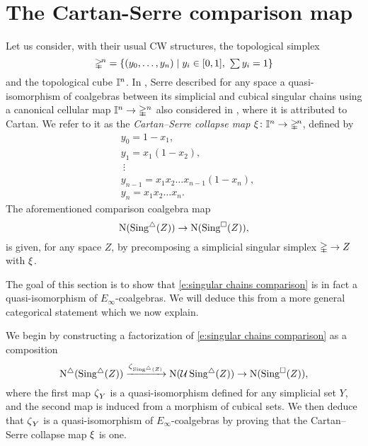 
\section{The Cartan-Serre comparison map} \label{s:the cartan-serre comparison map}

Let us consider, with their usual CW structures, the topological simplex
\[
\mathbb{\Delta}^{\!n} = \{(y_0, \dots, y_n) \mid y_i \in [0,1], \ \textstyle{\sum} \, y_i = 1\}
\]
and the topological cube $\mathbb{I}^n$.
In \cite[p. 442]{serre1951homologie}, Serre described for any space a quasi-isomorphism of coalgebras between its simplicial and cubical singular chains using a canonical cellular map $\mathbb{I}^n \to \mathbb{\Delta}^n$ also considered in \cite[p.199]{eilenberg1953acyclic}, where it is attributed to Cartan.
We refer to it as the \textit{Cartan--Serre collapse map} $\operatorname{\xi} \colon \mathbb{I}^n \to \mathbb{\Delta}^{\!n}$, defined by
\begin{equation} \label{e:cartan-serre collapse map}
\begin{split}
&y_0 = 1 - x_1, \\
&y_1 = x_1(1 - x_2), \\
&\ \vdots \\
&y_{n-1} = x_1 x_2 \dots x_{n-1}(1-x_n), \\
&y_{n} = x_1 x_2 \dots x_n.
\end{split}
\end{equation}
The aforementioned comparison coalgebra map
\begin{equation} \label{e:singular chains comparison}
\operatorname{N}(\operatorname{Sing^{\triangle}}(Z)) \to
\operatorname{N}(\operatorname{Sing^{\square}}(Z)),
\end{equation}
is given, for any space $Z$, by precomposing a simplicial singular simplex $\mathbb{\Delta} \to Z$ with $\operatorname{\xi}$.

The goal of this section is to show that \eqref{e:singular chains comparison} is in fact a quasi-isomorphism of $E_\infty$-coalgebras.
We will deduce this from a more general categorical statement which we now explain.

We begin by constructing a factorization of \eqref{e:singular chains comparison} as a composition
\[
\operatorname{N^{\triangle}}(\operatorname{Sing^{\triangle}}(Z)) \xrightarrow{\operatorname{\zeta}_{\operatorname{Sing^{\triangle}}(Z)}}
\operatorname{N}(\operatorname{\mathcal{U}} \operatorname{Sing^{\triangle}}(Z)) \to
\operatorname{N}(\operatorname{Sing^{\square}}(Z)),
\]
where the first map $\operatorname{\zeta}_Y$ is a quasi-isomorphism defined for any simplicial set $Y$, and the second map is induced from a morphism of cubical sets.
We then deduce that $\operatorname{\zeta}_Y$ is a quasi-isomorphism of $E_\infty$-coalgebras by proving that the Cartan--Serre collapse map $\operatorname{\xi}$ is one.


